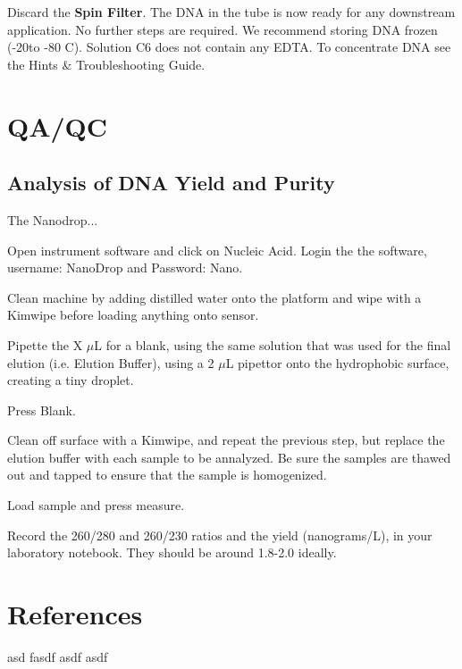 \documentclass[12pt]{../SOP4_alpha}\usepackage[]{graphicx}\usepackage[]{xcolor}
\begin{document}
\NP Discard the \textbf{Spin Filter}. The DNA in the tube is now ready for any downstream application. No further steps are required. We recommend storing DNA frozen (-20\degree to -80 \degree C). Solution C6 does not contain any EDTA. To concentrate DNA see the Hints \& Troubleshooting Guide.

\section{QA/QC}

\subsection*{Analysis of DNA Yield and Purity}

\NP The Nanodrop...

\NP Open instrument software and click on Nucleic Acid. Login the the software, username: NanoDrop and Password: Nano.

\NP Clean machine by adding distilled water onto the platform and wipe with a Kimwipe before loading anything onto sensor. 

\NP Pipette the X $\mu$L for a blank, using the same solution that was used for the final elution (i.e. Elution Buffer), using a 2 $\mu$L pipettor onto the hydrophobic surface, creating a tiny droplet.

\NP Press Blank.

\NP Clean off surface with a Kimwipe, and repeat the previous step, but replace the elution buffer with each sample to be annalyzed. Be sure the samples are thawed out and tapped to ensure that the sample is homogenized.

\NP Load sample and press measure.

\NP Record the 260/280 and 260/230 ratios and the yield (nanograms/L), in your laboratory notebook. They should be around 1.8-2.0 ideally. 


\section{References}

\NP asd fasdf asdf asdf 
\end{document}
